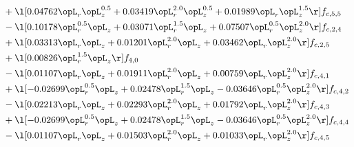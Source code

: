\begin{alignat}{2}
& + \l[  0.04762 \opL_r \opL_z^{0.5} +  0.03419 \opL_r^{2.0} \opL_z^{0.5} +  0.01989 \opL_r \opL_z^{1.5}  \r] f_{c,5,5} \nonumber \\ 
& - \l[  0.10178 \opL_r^{0.5} \opL_z +  0.03071 \opL_r^{1.5} \opL_z +  0.07507 \opL_r^{0.5} \opL_z^{2.0}  \r] f_{c,2,4} \nonumber \\ 
& + \l[  0.03313 \opL_r \opL_z +  0.01201 \opL_r^{2.0} \opL_z +  0.03462 \opL_r \opL_z^{2.0}  \r] f_{c,2,5} \nonumber \\ 
& + \l[  0.00826 \opL_r^{1.5} \opL_z  \r] f_{4,0} \nonumber \\ 
& - \l[  0.01107 \opL_r \opL_z +  0.01911 \opL_r^{2.0} \opL_z +  0.00759 \opL_r \opL_z^{2.0}  \r] f_{c,4,1} \nonumber \\ 
& + \l[  -0.02699 \opL_r^{0.5} \opL_z +  0.02478 \opL_r^{1.5} \opL_z   -0.03646 \opL_r^{0.5} \opL_z^{2.0}  \r] f_{c,4,2} \nonumber \\ 
& - \l[  0.02213 \opL_r \opL_z +  0.02293 \opL_r^{2.0} \opL_z +  0.01792 \opL_r \opL_z^{2.0}  \r] f_{c,4,3} \nonumber \\ 
& + \l[  -0.02699 \opL_r^{0.5} \opL_z +  0.02478 \opL_r^{1.5} \opL_z   -0.03646 \opL_r^{0.5} \opL_z^{2.0}  \r] f_{c,4,4} \nonumber \\ 
& - \l[  0.01107 \opL_r \opL_z +  0.01503 \opL_r^{2.0} \opL_z +  0.01033 \opL_r \opL_z^{2.0}  \r] f_{c,4,5} \nonumber \\ 
\end{alignat} 


